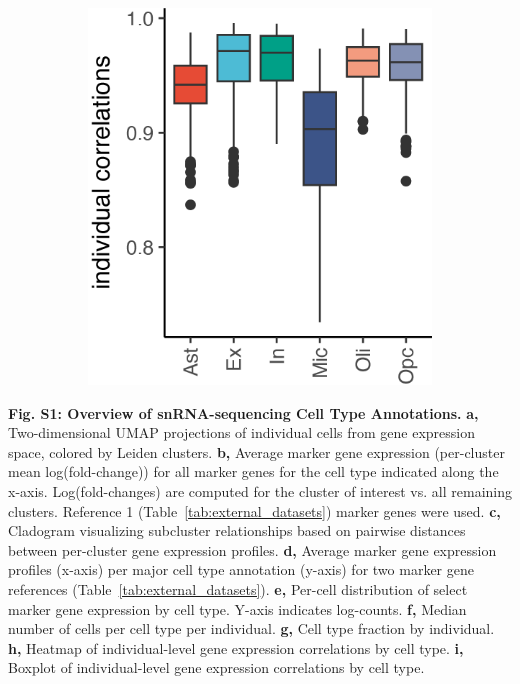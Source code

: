\begin{figure}[H]
\begin{subfigure}[t]{.15\textwidth}
        \includegraphics[width=\textwidth]{../paper/extended_plots/individual_correlations.png}        
    \end{subfigure}
\end{figure}

\textbf{Fig. S1: Overview of snRNA-sequencing Cell Type Annotations.}
\textbf{a,} Two-dimensional UMAP projections of individual cells from gene expression space, colored by Leiden clusters. 
\textbf{b,} Average marker gene expression (per-cluster mean log(fold-change)) for all marker genes for the cell type indicated along the x-axis. Log(fold-changes) are computed for the cluster of interest vs. all remaining clusters. Reference 1 (Table~\ref{tab:external_datasets}) marker genes were used. 
\textbf{c,} Cladogram visualizing subcluster relationships based on pairwise distances between per-cluster gene expression profiles. 
\textbf{d,} Average marker gene expression profiles (x-axis) per major cell type annotation (y-axis) for two marker gene references (Table~\ref{tab:external_datasets}). 
\textbf{e,} Per-cell distribution of select marker gene expression by cell type. Y-axis indicates log-counts. 
\textbf{f,} Median number of cells per cell type per individual. 
\textbf{g,} Cell type fraction by individual. 
\textbf{h,} Heatmap of individual-level gene expression correlations by cell type. 
\textbf{i,} Boxplot of individual-level gene expression correlations by cell type. 

